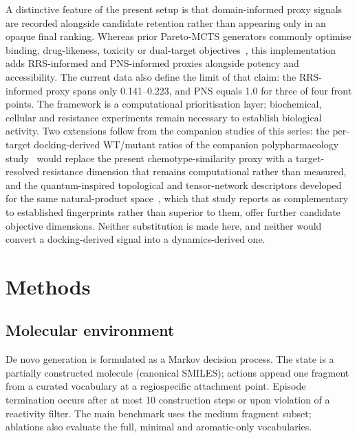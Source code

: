 \documentclass[10pt,a4paper]{article}
\begin{document}
A distinctive feature of the present setup is that domain-informed proxy signals are recorded alongside candidate retention rather than appearing only in an opaque final ranking. Whereas prior Pareto-MCTS generators commonly optimise binding, drug-likeness, toxicity or dual-target objectives~\citep{Mothra2024,ParetoDrug2024,CombiMOTS2026}, this implementation adds RRS-informed and PNS-informed proxies alongside potency and accessibility. The current data also define the limit of that claim: the RRS-informed proxy spans only \num{0.141}--\num{0.223}, and PNS equals \num{1.0} for three of four front points. The framework is a computational prioritisation layer; biochemical, cellular and resistance experiments remain necessary to establish biological activity. Two extensions follow from the companion studies of this series: the per-target docking-derived WT/mutant ratios of the companion polypharmacology study~\citep{Temgoua2026b} would replace the present chemotype-similarity proxy with a target-resolved resistance dimension that remains computational rather than measured, and the quantum-inspired topological and tensor-network descriptors developed for the same natural-product space~\citep{Temgoua2026c}, which that study reports as complementary to established fingerprints rather than superior to them, offer further candidate objective dimensions. Neither substitution is made here, and neither would convert a docking-derived signal into a dynamics-derived one.

\section{Methods}

\subsection{Molecular environment}
\label{sec:env}

De novo generation is formulated as a Markov decision process. The state is a partially constructed molecule (canonical SMILES); actions append one fragment from a curated vocabulary at a regiospecific attachment point. Episode termination occurs after at most \num{10} construction steps or upon violation of a reactivity filter. The main benchmark uses the medium fragment subset; ablations also evaluate the full, minimal and aromatic-only vocabularies.
\end{document}

